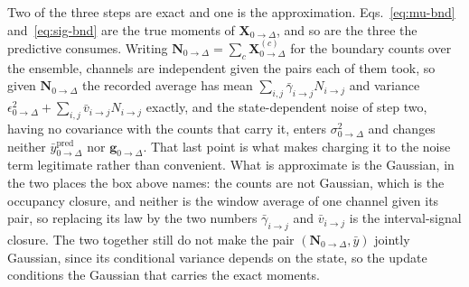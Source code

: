 \begin{appendixbox}
Two of the three steps are exact and one is the approximation. Eqs.~\ref{eq:mu-bnd}
and~\ref{eq:sig-bnd} are the true moments of $\mathbf{X}_{0\to\Delta}$, and so are the three
the predictive consumes. Writing $\mathbf{N}_{0\to\Delta}=\sum_c\mathbf{X}^{(c)}_{0\to\Delta}$
for the boundary counts over the ensemble, channels are independent given the pairs each of
them took, so given $\mathbf{N}_{0\to\Delta}$ the recorded average has mean
$\sum_{i,j}\bar{\gamma}_{i\to j}N_{i\to j}$ and variance
$\epsilon^2_{0\to\Delta} + \sum_{i,j}\bar{v}_{i\to j}N_{i\to j}$
exactly, and the state-dependent noise of step two, having no covariance with the counts that
carry it, enters $\sigma^2_{0\to\Delta}$ and changes neither $\bar{y}^{\mathrm{pred}}_{0\to\Delta}$ nor
$\mathbf{g}_{0\to\Delta}$. That last point is what makes charging it to the noise term legitimate rather
than convenient. What is
approximate is the Gaussian, in the two places the box above names: the counts are not
Gaussian, which is the occupancy closure, and neither is the window average of one channel
given its pair, so replacing its law by the two numbers $\bar{\gamma}_{i\to j}$ and
$\bar{v}_{i\to j}$ is the interval-signal closure. The two together still do not make
the pair $(\mathbf{N}_{0\to\Delta},\bar{y})$ jointly Gaussian, since its conditional variance
depends on the state, so the update conditions the Gaussian that carries the exact moments.
%

\end{appendixbox}
